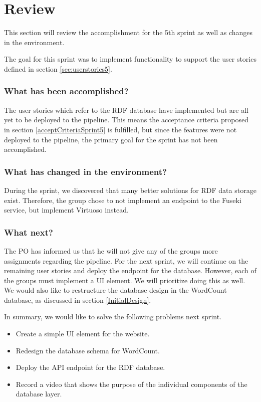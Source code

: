 \section{Review}
This section will review the accomplishment for the 5th sprint as well as changes in the \knox{} environment. 

The goal for this sprint was to implement functionality to support the user stories defined in section \ref{sec:userstories5}. 

\subsubsection*{What has been accomplished?}
The user stories which refer to the RDF database have implemented but are all yet to be deployed to the \knox{} pipeline. This means the acceptance criteria proposed in section \ref{acceptCriteriaSprint5} is fulfilled, but since the features were not deployed to the pipeline, the primary goal for the sprint has not been accomplished. 

\subsubsection*{What has changed in the environment?}
During the sprint, we discovered that many better solutions for RDF data storage exist. Therefore, the group chose to not implement an endpoint to the Fuseki service, but implement Virtuoso instead. 

\subsubsection*{What next?}
The PO has informed us that he will not give any of the \knox{} groups more assignments regarding the pipeline. 
For the next sprint, we will continue on the remaining user stories and deploy the endpoint for the database.
However, each of the \knox{} groups must implement a UI element. We will prioritize doing this as well.
We would also like to restructure the database design in the WordCount database, as discussed in section \ref{InitialDesign}.


In summary, we would like to solve the following problems next sprint.

\begin{itemize}
    \item Create a simple UI element for the \knox{} website.
    \item Redesign the database schema for WordCount.
    \item Deploy the API endpoint for the RDF database.
    \item Record a video that shows the purpose of the individual components of the database layer.
\end{itemize}

